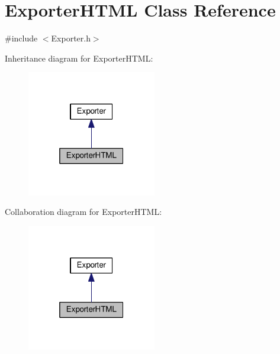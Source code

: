 \hypertarget{class_exporter_h_t_m_l}{}\section{Exporter\+H\+T\+ML Class Reference}
\label{class_exporter_h_t_m_l}


{\ttfamily \#include $<$Exporter.\+h$>$}



Inheritance diagram for Exporter\+H\+T\+ML\+:\nopagebreak
\begin{figure}[H]
\begin{center}
\leavevmode
\includegraphics[width=160pt]{class_exporter_h_t_m_l__inherit__graph}
\end{center}
\end{figure}


Collaboration diagram for Exporter\+H\+T\+ML\+:\nopagebreak
\begin{figure}[H]
\begin{center}
\leavevmode
\includegraphics[width=160pt]{class_exporter_h_t_m_l__coll__graph}
\end{center}
\end{figure}

